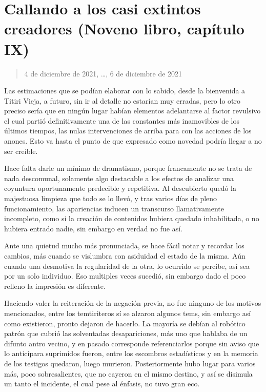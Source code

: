 \documentclass[
  spanish,
]{book}
\begin{document}
\hypertarget{callando-a-los-casi-extintos-creadores-noveno-libro-capuxedtulo-ix}{%
\section{Callando a los casi extintos creadores (Noveno libro, capítulo IX)}\label{callando-a-los-casi-extintos-creadores-noveno-libro-capuxedtulo-ix}}

\begin{quote}
4 de diciembre de 2021, \ldots, 6 de diciembre de 2021
\end{quote}

Las estimaciones que se podían elaborar con lo sabido, desde la bienvenida a Titiri Vieja, a futuro, sin ir al detalle no estarían muy erradas, pero lo otro preciso sería que en ningún lugar habían elementos adelantarse al factor revulsivo el cual partió definitivamente una de las constantes más inamovibles de los últimos tiempos, las nulas intervenciones de arriba para con las acciones de los anones. Esto va hasta el punto de que expresado como novedad podría llegar a no ser creíble.

Hace falta darle un mínimo de dramatismo, porque francamente no se trata de nada descomunal, solamente algo destacable a los efectos de analizar una coyuntura oportunamente predecible y repetitiva. Al descubierto quedó la majestuosa limpieza que todo se lo llevó, y tras varios días de pleno funcionamiento, las apariencias inducen un transcurso llamativamente incompleto, como si la creación de contenidos hubiera quedado inhabilitada, o no hubiera entrado nadie, sin embargo en verdad no fue así.

Ante una quietud mucho más pronunciada, se hace fácil notar y recordar los cambios, más cuando se vislumbra con asiduidad el estado de la misma. Aún cuando una desmotiva la regularidad de la otra, lo ocurrido se percibe, así sea por un solo individuo. Eso multiples veces sucedió, sin embargo dado el poco relleno la impresión es diferente.

Haciendo valer la reiteración de la negación previa, no fue ninguno de los motivos mencionados, entre los temtiriteros sí se alzaron algunos tems, sin embargo así como existieron, pronto dejaron de hacerlo. La mayoría se debían al robótico patrón que cubrió las solventadas desapariciones, más uno que hablaba de un difunto antro vecino, y en pasado corresponde referenciarlos porque sin aviso que lo anticipara suprimidos fueron, entre los escombros estadísticos y en la memoria de los testigos quedaron, luego murieron. Posteriormente hubo lugar para varios más, poco sobresalientes, que no cayeron en el mismo destino, y así se disimula un tanto el incidente, el cual pese al énfasis, no tuvo gran eco.
\end{document}
